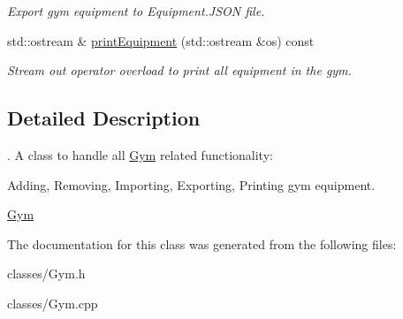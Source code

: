 \begin{DoxyCompactItemize}
\begin{DoxyCompactList}\small\item\em Export gym equipment to Equipment.\+J\+S\+O\+N file. \end{DoxyCompactList}\item 
\hypertarget{class_gym_ab5dcdfbe1701e5c478408d82d1c03c03}{}std\+::ostream \& \hyperlink{class_gym_ab5dcdfbe1701e5c478408d82d1c03c03}{print\+Equipment} (std\+::ostream \&os) const \label{class_gym_ab5dcdfbe1701e5c478408d82d1c03c03}

\begin{DoxyCompactList}\small\item\em Stream out operator overload to print all equipment in the gym. \end{DoxyCompactList}\end{DoxyCompactItemize}


\subsection{Detailed Description}
. A class to handle all \hyperlink{class_gym}{Gym} related functionality\+:
\begin{DoxyItemize}
\item Adding, Removing, Importing, Exporting, Printing gym equipment.
\end{DoxyItemize}

\hyperlink{class_gym}{Gym} 

The documentation for this class was generated from the following files\+:\begin{DoxyCompactItemize}
\item 
classes/Gym.\+h\item 
classes/Gym.\+cpp\end{DoxyCompactItemize}
